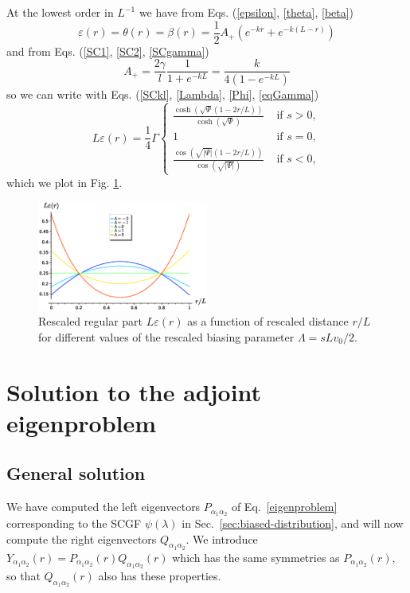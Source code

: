 \documentclass[pre,aps,superscriptaddress,nofootinbib]{revtex4}
\begin{document}
At the lowest order in $L^{-1}$ we have from Eqs. (\ref{epsilon}, \ref{theta}, \ref{beta})
\begin{equation}
\varepsilon(r) = \theta(r) = \beta(r) = \frac{1}{2} A_+ (e^{-kr} + e^{-k(L-r)})
\end{equation}
and from Eqs. (\ref{SC1}, \ref{SC2}, \ref{SCgamma})
\begin{equation}
A_+ = \frac{2\gamma}{l} \frac{1}{1 + e^{-kL}} = \frac{k}{4(1 - e^{-kL})}
\end{equation}
so we can write with Eqs. (\ref{SCkl}, \ref{Lambda}, \ref{Phi}, \ref{eqGamma})
\begin{equation}
L \varepsilon(r) = \frac{1}{4} \Gamma \begin{cases} \frac{\cosh\left(\sqrt{\Psi}(1 - 2r/L)\right)}{\cosh\left(\sqrt{\Psi}\right)} &\text{ if } s > 0, \\ 1 &\text{ if } s = 0, \\ \frac{\cos\left(\sqrt{|\Psi|}(1 - 2r/L)\right)}{\cos\left(\sqrt{|\Psi|}\right)} &\text{ if } s < 0, \end{cases}
\end{equation}
which we plot in Fig. \ref{fig:epsilon}.

\begin{figure}[H]
\centering
\includegraphics[width=0.5\textwidth]{epsilon.eps}
\caption{Rescaled regular part $L \varepsilon(r)$ as a function of rescaled distance $r/L$ for different values of the rescaled biasing parameter $\Lambda = s L v_0/2$.}
\label{fig:epsilon}
\end{figure}

\section{Solution to the adjoint eigenproblem}

\subsection{General solution}

We have computed the left eigenvectors $P_{\alpha_1\alpha_2}$ of Eq.~\ref{eigenproblem} corresponding to the SCGF $\psi(\lambda)$ in Sec.~\ref{sec:biased-distribution}, and will now compute the right eigenvectors $Q_{\alpha_1\alpha_2}$.
We introduce $Y_{\alpha_1\alpha_2}(r) = P_{\alpha_1\alpha_2}(r) Q_{\alpha_1\alpha_2}(r)$ which has the same symmetries as $P_{\alpha_1\alpha_2}(r)$, so that $Q_{\alpha_1\alpha_2}(r)$ also has these properties.\\
\end{document}
